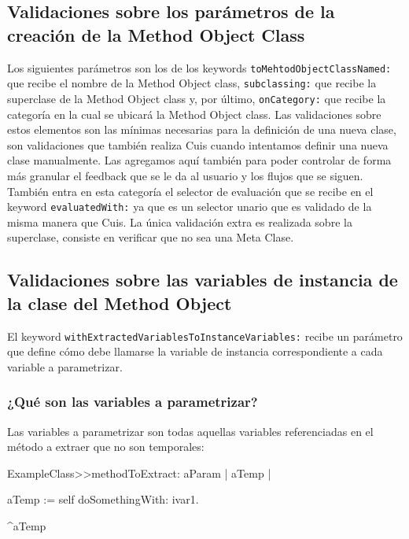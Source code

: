 \subsection*{Validaciones sobre los parámetros de la creación de la Method Object Class}

Los siguientes parámetros son los de los keywords \lstinline{toMehtodObjectClassNamed:} que recibe
el nombre de la Method Object class, \lstinline{subclassing:} que recibe la superclase de la Method
Object class y, por último, \lstinline{onCategory:} que recibe la categoría en la cual se ubicará la
Method Object class. Las validaciones sobre estos elementos son las mínimas necesarias para la
definición de una nueva clase, son validaciones que también realiza Cuis cuando intentamos definir
una nueva clase manualmente. Las agregamos aquí también para poder controlar de forma más granular
el feedback que se le da al usuario y los flujos que se siguen. También entra en esta categoría
el selector de evaluación que se recibe en el keyword \lstinline{evaluatedWith:} ya que es un selector
unario que es validado de la misma manera que Cuis.
La única validación extra es realizada sobre la superclase, consiste en verificar que no sea una
Meta Clase.



\subsection*{Validaciones sobre las variables de instancia de la clase del Method Object}

El keyword \lstinline{withExtractedVariablesToInstanceVariables:} recibe un parámetro que define
cómo debe llamarse la variable de instancia correspondiente a cada variable a parametrizar. 

\subsubsection*{¿Qué son las variables a parametrizar?}
Las variables a parametrizar son todas aquellas variables referenciadas en el método a extraer que
no son temporales:

\begin{code}
ExampleClass>>methodToExtract: aParam
    | aTemp |

    aTemp := self doSomethingWith: ivar1.
    
    ^aTemp
\end{code}


